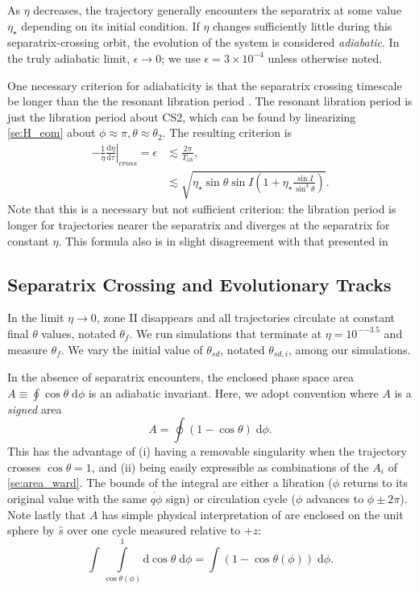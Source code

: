 \documentclass[
        fleqn,
        usenatbib,
    ]{mnras}
\newcommand*{\rd}[2]{\frac{\mathrm{d}#1}{\mathrm{d}#2}}
\newcommand*{\at}[1]{\left.#1\right|}
\newcommand*{\p}[1]{\left(#1\right)}
\begin{document}
As $\eta$ decreases, the trajectory generally encounters the separatrix at some
value $\eta_\star$ depending on its initial condition. If $\eta$ changes
sufficiently little during this separatrix-crossing orbit, the evolution of the
system is considered \emph{adiabatic}. In the truly adiabatic limit, $\epsilon
\to 0$; we use $\epsilon = 3 \times 10^{-4}$ unless otherwise noted.

One necessary criterion for adiabaticity is that the separatrix crossing
timescale be longer than the the resonant libration period \citep{ward2004I}.
The resonant libration period is just the libration period about CS2, which can
be found by linearizing \autoref{se:H_eom} about $\phi \approx \pi, \theta
\approx \theta_2$. The resulting criterion is
\begin{align}
    -\at{\frac{1}{\eta}\rd{\eta}{\tau}}_{cross} = \epsilon &\lesssim
            \frac{2\pi}{T_{lib}},\\
        &\lesssim \sqrt{\eta_\star\sin\theta \sin I
            \p{1 + \eta_\star \frac{\sin I}{\sin^3\theta}}}.\label{eq:ad_constr}
\end{align}
Note that this is a necessary but not sufficient criterion: the libration period
is longer for trajectories nearer the separatrix and diverges at the separatrix
for constant $\eta$. This formula also is in slight disagreement with that
presented in \citealt{millholland_disk}

\subsection{Separatrix Crossing and Evolutionary Tracks
}\label{ss:zone_transitions}

In the limit $\eta \to 0$, zone II disappears and all trajectories circulate at
constant final $\theta$ values, notated $\theta_f$. We run simulations that
terminate at $\eta = 10^{-{-3.5}}$ and measure $\theta_{f}$. We vary the initial
value of $\theta_{sd}$, notated $\theta_{sd, i}$, among our simulations.

In the absence of separatrix encounters, the enclosed phase space area $A \equiv
\oint \cos\theta \;\mathrm{d}\phi$ is an adiabatic invariant. Here, we adopt
convention where $A$ is a \emph{signed} area
\begin{equation}
    A = \oint \p{1 - \cos \theta}\;\mathrm{d}\phi.
\end{equation}
This has the advantage of (i) having a removable singularity when the trajectory
crosses $\cos \theta = 1$, and (ii) being easily expressible as combinations of
the $A_i$ of \autoref{se:area_ward}. The bounds of the integral are either a
libration ($\phi$ returns to its original value with the same $\dot{q\phi}$
sign) or circulation cycle ($\phi$ advances to $\phi \pm 2\pi$). Note lastly
that $A$ has simple physical interpretation of are enclosed on the unit sphere
by $\hat{s}$ over one cycle measured relative to $+\hat{z}$:
\begin{equation*}
    \int \int\limits_{\cos \theta(\phi)}^1
        \mathrm{d}\cos\theta\;\mathrm{d}\phi = \int \p{1 - \cos \theta(\phi)}
            \;\mathrm{d}\phi.
\end{equation*}
\end{document}
